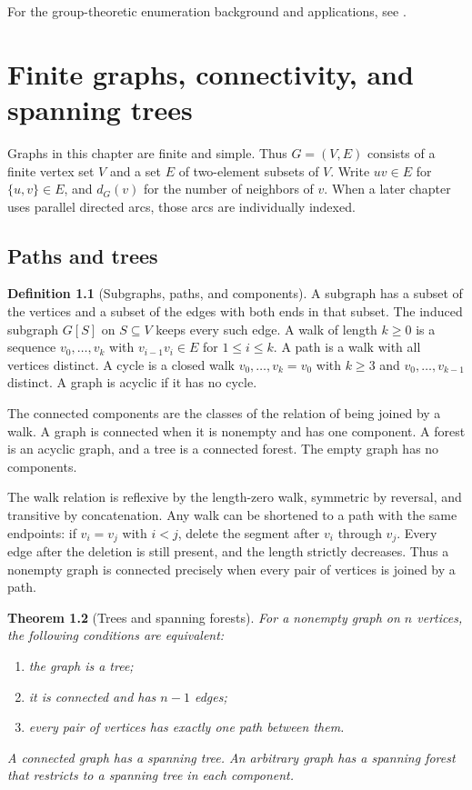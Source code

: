 \documentclass[11pt,oneside,openany]{book}
\theoremstyle{plain}
\newtheorem{theorem}{Theorem}[chapter]
\theoremstyle{definition}
\newtheorem{definition}[theorem]{Definition}
\theoremstyle{remark}
\begin{document}
For the group-theoretic enumeration background and applications,
see \cite{Polya}.
\chapter{Finite graphs, connectivity, and spanning trees}
\label{p204:ch06}

Graphs in this chapter are finite and simple. Thus \(G=(V,E)\) consists of
a finite vertex set \(V\) and a set \(E\) of two-element subsets of \(V\).
Write \(uv\in E\) for \(\{u,v\}\in E\), and \(d_G(v)\) for the number of
neighbors of \(v\). When a later chapter uses parallel directed arcs,
those arcs are individually indexed.

\section{Paths and trees}

\begin{definition}[Subgraphs, paths, and components]\label{p204:W35}
A subgraph has a subset of the vertices and a subset of the edges with
both ends in that subset. The induced subgraph \(G[S]\) on \(S\subseteq V\)
keeps every such edge. A walk of length \(k\geq 0\) is a sequence
\(v_0,\ldots,v_k\) with \(v_{i-1}v_i\in E\) for \(1\leq i\leq k\).
A path is a walk with all vertices distinct. A cycle is a closed walk
\(v_0,\ldots,v_k=v_0\) with \(k\geq 3\) and \(v_0,\ldots,v_{k-1}\)
distinct. A graph is acyclic if it has no cycle.

The connected components are the classes of the relation of being joined
by a walk. A graph is connected when it is nonempty and has one component.
A forest is an acyclic graph, and a tree is a connected forest.
The empty graph has no components.
\end{definition}

The walk relation is reflexive by the length-zero walk, symmetric by
reversal, and transitive by concatenation. Any walk can be shortened to a
path with the same endpoints: if \(v_i=v_j\) with \(i<j\), delete the
segment after \(v_i\) through \(v_j\). Every edge after the deletion is
still present, and the length strictly decreases. Thus a nonempty graph
is connected precisely when every pair of vertices is joined by a path.

\begin{theorem}[Trees and spanning forests]\label{p204:W36}
For a nonempty graph on \(n\) vertices, the following conditions are
equivalent:
\begin{enumerate}
\item the graph is a tree;
\item it is connected and has \(n-1\) edges;
\item every pair of vertices has exactly one path between them.
\end{enumerate}
A connected graph has a spanning tree. An arbitrary graph has a
spanning forest that restricts to a spanning tree in each component.
\end{theorem}
\end{document}

